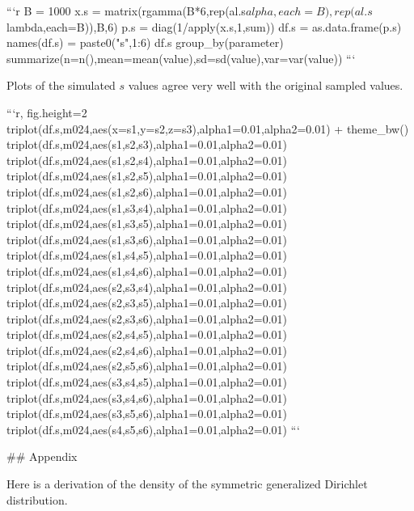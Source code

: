 ```{r}
B = 1000
x.s = matrix(rgamma(B*6,rep(al.s$alpha,each=B),rep(al.s$lambda,each=B)),B,6)
p.s = diag(1/apply(x.s,1,sum)) %
df.s = as.data.frame(p.s)
names(df.s) = paste0("s",1:6)
df.s %
  group_by(parameter) %
  summarize(n=n(),mean=mean(value),sd=sd(value),var=var(value))
```

Plots of the simulated $s$ values agree very well with the original sampled values.

```{r, fig.height=2}
triplot(df.s,m024,aes(x=s1,y=s2,z=s3),alpha1=0.01,alpha2=0.01) + theme_bw()
triplot(df.s,m024,aes(s1,s2,s3),alpha1=0.01,alpha2=0.01)
triplot(df.s,m024,aes(s1,s2,s4),alpha1=0.01,alpha2=0.01)
triplot(df.s,m024,aes(s1,s2,s5),alpha1=0.01,alpha2=0.01)
triplot(df.s,m024,aes(s1,s2,s6),alpha1=0.01,alpha2=0.01)
triplot(df.s,m024,aes(s1,s3,s4),alpha1=0.01,alpha2=0.01)
triplot(df.s,m024,aes(s1,s3,s5),alpha1=0.01,alpha2=0.01)
triplot(df.s,m024,aes(s1,s3,s6),alpha1=0.01,alpha2=0.01)
triplot(df.s,m024,aes(s1,s4,s5),alpha1=0.01,alpha2=0.01)
triplot(df.s,m024,aes(s1,s4,s6),alpha1=0.01,alpha2=0.01)
triplot(df.s,m024,aes(s2,s3,s4),alpha1=0.01,alpha2=0.01)
triplot(df.s,m024,aes(s2,s3,s5),alpha1=0.01,alpha2=0.01)
triplot(df.s,m024,aes(s2,s3,s6),alpha1=0.01,alpha2=0.01)
triplot(df.s,m024,aes(s2,s4,s5),alpha1=0.01,alpha2=0.01)
triplot(df.s,m024,aes(s2,s4,s6),alpha1=0.01,alpha2=0.01)
triplot(df.s,m024,aes(s2,s5,s6),alpha1=0.01,alpha2=0.01)
triplot(df.s,m024,aes(s3,s4,s5),alpha1=0.01,alpha2=0.01)
triplot(df.s,m024,aes(s3,s4,s6),alpha1=0.01,alpha2=0.01)
triplot(df.s,m024,aes(s3,s5,s6),alpha1=0.01,alpha2=0.01)
triplot(df.s,m024,aes(s4,s5,s6),alpha1=0.01,alpha2=0.01)
```

## Appendix

Here is a derivation of the density of the symmetric generalized Dirichlet distribution.

